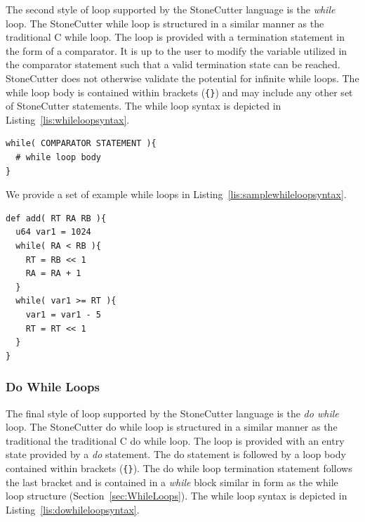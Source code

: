 \documentclass{article}
\begin{document}
The second style of loop supported by the StoneCutter language is the \textit{while} loop.  The StoneCutter 
while loop is structured in a similar manner as the traditional C while loop.  The loop is provided with a 
termination statement in the form of a comparator.  It is up to the user to modify the variable utilized 
in the comparator statement such that a valid termination state can be reached.  StoneCutter does not otherwise 
validate the potential for infinite while loops.  The while loop body is contained within brackets 
(\texttt{\{\}}) and may include any other set of StoneCutter statements.  The while loop syntax is depicted in 
Listing~\ref{lis:whileloopsyntax}.  

\vspace{0.125in}
\begin{lstlisting}[frame=single,style=base,caption={While Loop Syntax},captionpos=b,label={lis:whileloopsyntax}]
while( COMPARATOR STATEMENT ){
  # while loop body
}
\end{lstlisting}

We provide a set of example while loops in Listing~\ref{lis:samplewhileloopsyntax}.

\vspace{0.125in}
\begin{lstlisting}[frame=single,style=base,caption={Sample While Loop Syntax},captionpos=b,label={lis:samplewhileloopsyntax}]
def add( RT RA RB ){
  u64 var1 = 1024
  while( RA < RB ){
    RT = RB << 1
    RA = RA + 1
  }
  while( var1 >= RT ){
    var1 = var1 - 5
    RT = RT << 1
  }
}
\end{lstlisting}

\clearpage
\subsubsection{Do While Loops}
\label{sec:DoWhileLoops}

The final style of loop supported by the StoneCutter language is the \textit{do while} loop.  The StoneCutter do while 
loop is structured in a similar manner as the traditional the traditional C do while loop.  The loop is provided with 
an entry state provided by a \textit{do} statement.  The do statement is followed by a loop body contained within brackets 
(\texttt{\{\}}).  The do while loop termination statement follows the last bracket and is contained in a \textit{while} block similar 
in form as the while loop structure (Section~\ref{sec:WhileLoops}).  The while loop syntax is depicted in 
Listing~\ref{lis:dowhileloopsyntax}.   
\end{document}
